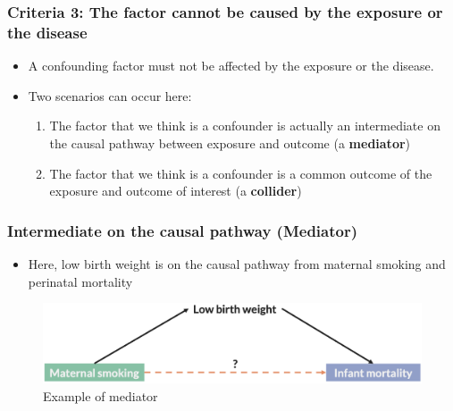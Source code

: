 \documentclass[
]{book}
\providecommand{\tightlist}{%
  \setlength{\itemsep}{0pt}\setlength{\parskip}{0pt}}
\begin{document}
\hypertarget{criteria-3-the-factor-cannot-be-caused-by-the-exposure-or-the-disease}{%
\subsubsection{Criteria 3: The factor cannot be caused by the exposure or the disease}\label{criteria-3-the-factor-cannot-be-caused-by-the-exposure-or-the-disease}}

\begin{itemize}
\tightlist
\item
  A confounding factor must not be affected by the exposure or the disease.
\item
  Two scenarios can occur here:

  \begin{enumerate}
  \def\labelenumi{\arabic{enumi}.}
  \tightlist
  \item
    The factor that we think is a confounder is actually an intermediate on the causal pathway between exposure and outcome (a \textbf{mediator})
  \item
    The factor that we think is a confounder is a common outcome of the exposure and outcome of interest (a \textbf{collider})
  \end{enumerate}
\end{itemize}

\hypertarget{intermediate-on-the-causal-pathway-mediator}{%
\subsubsection{Intermediate on the causal pathway (Mediator)}\label{intermediate-on-the-causal-pathway-mediator}}

\begin{itemize}
\tightlist
\item
  Here, low birth weight is on the causal pathway from maternal smoking and perinatal mortality
\end{itemize}

\begin{figure}

{\centering \includegraphics[width=1\linewidth]{img/confounding/mediator_example} 

}

\caption{Example of mediator}\label{fig:unnamed-chunk-3}
\end{figure}
\end{document}
